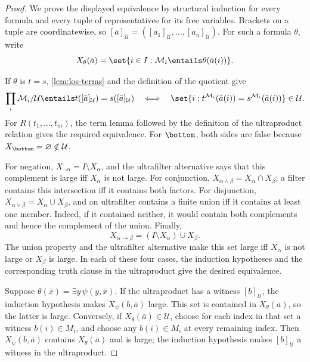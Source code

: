 \begin{proof}
We prove the displayed equivalence by structural induction for every formula
and every tuple of representatives for its free variables.  Brackets on a
tuple are coordinatewise, so
\([\bar a]_{\mathcal U}=([a_1]_{\mathcal U},\ldots,[a_n]_{\mathcal U})\).
For such a formula \(\theta\), write
\[
  X_\theta(\bar a)=
  \set{i\in I:\mathcal M_i\entails\theta(\bar a(i))}.
\]

If \(\theta\) is \(t=s\), \cref{lem:los-terms} and the definition of the
quotient give
\[
  \prod_i\mathcal M_i/\mathcal U\entails
  t([\bar a]_{\mathcal U})=s([\bar a]_{\mathcal U})
  \quad\Longleftrightarrow\quad
  \set{i:t^{\mathcal M_i}(\bar a(i))
               =s^{\mathcal M_i}(\bar a(i))}\in\mathcal U.
\]
For \(R(t_1,\ldots,t_m)\), the term lemma followed by the definition of the
ultraproduct relation gives the required equivalence.  For \(\bottom\), both
sides are false because \(X_{\bottom}=\varnothing\notin\mathcal U\).

For negation,
\(X_{\neg\alpha}=I\setminus X_\alpha\), and the ultrafilter alternative says
that this complement is large iff \(X_\alpha\) is not large.  For
conjunction,
\(X_{\alpha\land\beta}=X_\alpha\cap X_\beta\); a filter contains this
intersection iff it contains both factors.  For disjunction,
\(X_{\alpha\lor\beta}=X_\alpha\cup X_\beta\), and an ultrafilter contains a
finite union iff it contains at least one member.  Indeed, if it
contained neither, it would contain both complements and hence the complement
of the union.  Finally,
\[
  X_{\alpha\to\beta}=(I\setminus X_\alpha)\cup X_\beta.
\]
The union property and the ultrafilter alternative make this set large iff
\(X_\alpha\) is not large or \(X_\beta\) is large.  In each of these four
cases, the induction hypotheses and the corresponding truth clause in the
ultraproduct give the desired equivalence.

Suppose \(\theta(\bar x)=\exists y\,\psi(y,\bar x)\).  If the ultraproduct
has a witness \([b]_{\mathcal U}\), the induction hypothesis makes
\(X_\psi(b,\bar a)\) large.  This set is contained in
\(X_\theta(\bar a)\), so the latter is large.  Conversely, if
\(X_\theta(\bar a)\in\mathcal U\), choose for each index in that set a
witness \(b(i)\in M_i\), and choose any \(b(i)\in M_i\) at every remaining
index.  Then \(X_\psi(b,\bar a)\) contains \(X_\theta(\bar a)\) and is large;
the induction hypothesis makes \([b]_{\mathcal U}\) a witness in the
ultraproduct.


\end{proof}
